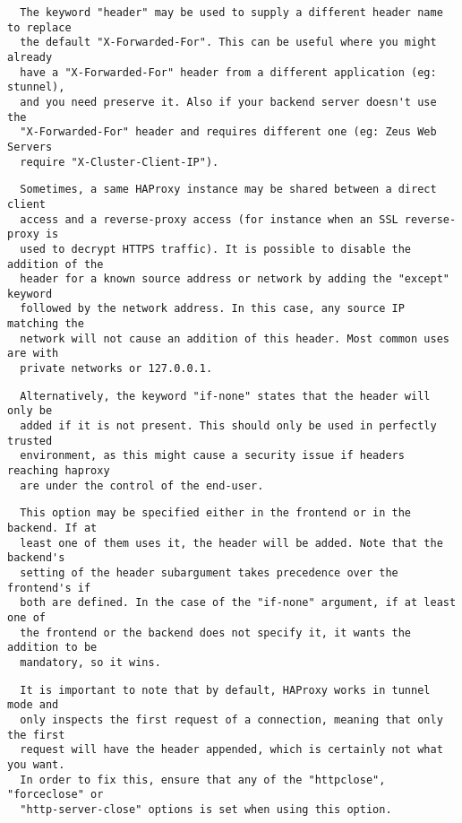 \begin{verbatim}
  The keyword "header" may be used to supply a different header name to replace
  the default "X-Forwarded-For". This can be useful where you might already
  have a "X-Forwarded-For" header from a different application (eg: stunnel),
  and you need preserve it. Also if your backend server doesn't use the
  "X-Forwarded-For" header and requires different one (eg: Zeus Web Servers
  require "X-Cluster-Client-IP").
\end{verbatim}

\begin{verbatim}
  Sometimes, a same HAProxy instance may be shared between a direct client
  access and a reverse-proxy access (for instance when an SSL reverse-proxy is
  used to decrypt HTTPS traffic). It is possible to disable the addition of the
  header for a known source address or network by adding the "except" keyword
  followed by the network address. In this case, any source IP matching the
  network will not cause an addition of this header. Most common uses are with
  private networks or 127.0.0.1.
\end{verbatim}

\begin{verbatim}
  Alternatively, the keyword "if-none" states that the header will only be
  added if it is not present. This should only be used in perfectly trusted
  environment, as this might cause a security issue if headers reaching haproxy
  are under the control of the end-user.
\end{verbatim}

\begin{verbatim}
  This option may be specified either in the frontend or in the backend. If at
  least one of them uses it, the header will be added. Note that the backend's
  setting of the header subargument takes precedence over the frontend's if
  both are defined. In the case of the "if-none" argument, if at least one of
  the frontend or the backend does not specify it, it wants the addition to be
  mandatory, so it wins.
\end{verbatim}

\begin{verbatim}
  It is important to note that by default, HAProxy works in tunnel mode and
  only inspects the first request of a connection, meaning that only the first
  request will have the header appended, which is certainly not what you want.
  In order to fix this, ensure that any of the "httpclose", "forceclose" or
  "http-server-close" options is set when using this option.
\end{verbatim}


